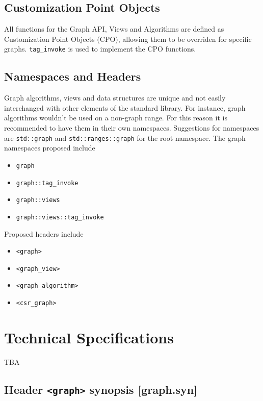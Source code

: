 \documentclass[10pt,onecolumn]{article}
\newcommand{\tcode}[1]{\lstinline[breaklines=true]{#1}}
\begin{document}
\subsection{Customization Point Objects}
All functions for the Graph API, Views and Algorithms are defined as Customization Point Objects (CPO), allowing them to be overriden for
specific graphs. \tcode{tag_invoke} is used to implement the CPO functions.

\subsection{Namespaces and Headers}
Graph algorithms, views and data structures are unique and not easily interchanged with other elements of the standard library. For
instance, graph algorithms wouldn't be used on a non-graph range. For this reason it is recommended to have them in their own 
namespaces. Suggestions for namespaces are \tcode{std::graph} and
\tcode{std::ranges::graph} for the root namespace. The graph namespaces proposed include
\begin{itemize}
\item[]\tcode{graph}
\item[]\tcode{graph::tag_invoke}
\item[]\tcode{graph::views}
\item[]\tcode{graph::views::tag_invoke}
\end{itemize}

Proposed headers include
\begin{itemize}
\item[]\tcode{<graph>}
\item[]\tcode{<graph_view>}
\item[]\tcode{<graph_algorithm>}
\item[]\tcode{<csr_graph>}
\end{itemize}

\section{Technical Specifications}
TBA

\subsection{Header \tcode{<graph>} synopsis [graph.syn]}
\end{document}
